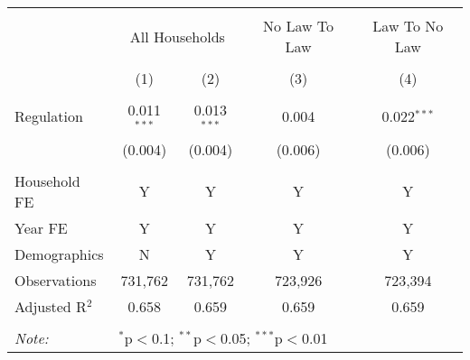 
\begin{table}[!htbp] \centering 
  \caption{} 
  \label{} 
\begin{tabular}{@{\extracolsep{5pt}}lcccc} 
\\[-1.8ex]\hline 
\hline \\[-1.8ex] 
 & \multicolumn{2}{c}{All Households} & No Law To Law & Law To No Law \\ 
\\[-1.8ex] & (1) & (2) & (3) & (4)\\ 
\hline \\[-1.8ex] 
 Regulation & 0.011$^{***}$ & 0.013$^{***}$ & 0.004 & 0.022$^{***}$ \\ 
  & (0.004) & (0.004) & (0.006) & (0.006) \\ 
 \hline \\[-1.8ex] 
Household FE & Y & Y & Y & Y \\ 
Year FE & Y & Y & Y & Y \\ 
Demographics & N & Y & Y & Y \\ 
Observations & 731,762 & 731,762 & 723,926 & 723,394 \\ 
Adjusted R$^{2}$ & 0.658 & 0.659 & 0.659 & 0.659 \\ 
\hline 
\hline \\[-1.8ex] 
\textit{Note:}  & \multicolumn{4}{l}{$^{*}$p$<$0.1; $^{**}$p$<$0.05; $^{***}$p$<$0.01} \\ 
\end{tabular} 
\end{table} 

